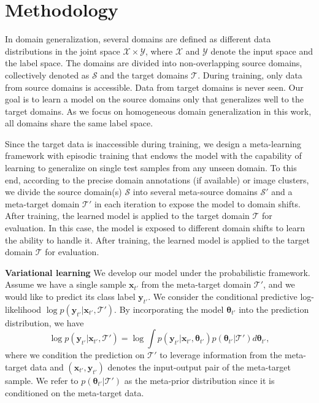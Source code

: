 \documentclass{article} \usepackage[table]{xcolor}
\newcommand{\x}{\mathbf{x}}
\newcommand{\y}{\mathbf{y}}
\newcommand{\btheta}{\boldsymbol{\theta}}
\begin{document}
\vspace{-3mm}
\section{Methodology}
\label{method}
\vspace{-2mm}


In domain generalization, several domains are defined as different data distributions in the joint space $\mathcal{X} \times \mathcal{Y}$, where $\mathcal{X}$ and $\mathcal{Y}$ denote the input space and the label space. 
The domains are divided into non-overlapping source domains, collectively denoted as $\mathcal{S}$ and the target domains $\mathcal{T}$. 
During training, only data from source domains is accessible. Data from target domains is never seen. Our goal is to learn a model on the source domains only that generalizes well to the target domains. As we focus on homogeneous domain generalization \citep{zhou2021domain} in this work, all domains share the same label space. 

Since the target data is inaccessible during training, we design a meta-learning framework with episodic training \citep{li2019episodic,balaji2018metareg} that endows the model with the capability of learning to generalize on single test samples from any unseen domain.
To this end, according to the precise domain annotations (if available) or image clusters, we divide the source domain(s) $\mathcal{S}$ into several meta-source domains $\mathcal{S'}$  and a meta-target domain $\mathcal{T'}$ in each iteration to expose the model to domain shifts. After training, the learned model is applied to the target domain $\mathcal{T}$ for evaluation.
In this case, the model is exposed to different domain shifts to learn the ability to handle it.
After training, the learned model is applied to the target domain $\mathcal{T}$ for evaluation.








\textbf{Variational learning} We develop our model under the probabilistic framework. Assume we have a single sample $\x_{t'}$ from the meta-target domain $\mathcal{T'}$, and we would like to predict its class label $\y_{t'}$. We consider the conditional predictive log-likelihood $\log p(\y_{t'}|\x_{t'},\mathcal{T'})$. By incorporating the model $\btheta_{t'}$ into the prediction distribution, we have
\begin{equation}
\label{eq1}
    \log p(\y_{t'}|\x_{t'}, \mathcal{T'}) = \log \int p(\y_{t'}|\x_{t'}, \btheta_{t'})p(\btheta_{t'}|\mathcal{T'})d\btheta_{t'},
\end{equation}
where we condition the prediction on  $\mathcal{T'}$ to leverage information from the meta-target data and $(\x_{t'}, \y_{t'})$ denotes the input-output pair of the meta-target sample. We refer to $p(\btheta_{t'}|\mathcal{T'})$ as the meta-prior distribution since it is conditioned on the meta-target data. 
\end{document}
